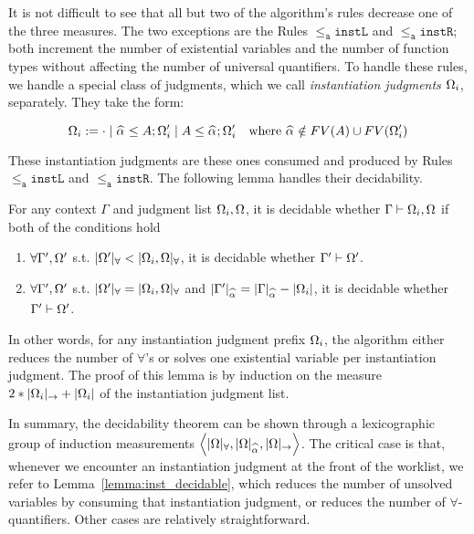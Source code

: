 It is not difficult to see that all but two of the algorithm's rules decrease
one of the three measures. The two exceptions are the Rules $\mathtt{{\le_a}instL}$ and $\mathtt{{\le_a}instR}$; both increment the number of existential
variables and the number of function types without affecting the number of
universal quantifiers.
To handle these rules, we handle a special class of judgments, which
we call \emph{instantiation judgments} $\exps_i$, separately. They 
take the form:
\begin{definition}[$\exps_i$]
$$\exps_i := \cdot \mid \jcons{\al\le A}{\exps_i'} \mid \jcons{A\le \al}{\exps_i'}
\quad\text{where } \al\notin FV(A)\cup FV(\exps_i')$$
\end{definition}
These instantiation judgments are these ones consumed and
produced by Rules $\mathtt{{\le_a}instL}$ and $\mathtt{{\le_a}instR}$.
The following lemma handles their decidability.
\begin{lemma}
	For any context $\Gamma$ and judgment list $\Omega_i, \Omega$, it is decidable whether $\Gamma\vdash \Omega_i,\Omega$ if both of the conditions hold
\begin{enumerate}[1)]
	\item $\forall \Gamma', \Omega'$ s.t. $|\Omega'|_\forall < |\Omega_i,\Omega|_\forall$, it is decidable whether $\Gamma'\vdash \Omega'$.
	\item $\forall \Gamma', \Omega'$ s.t. $|\Omega'|_\forall = |\Omega_i,\Omega|_\forall$ and $|\Gamma'|_{\al} = |\Gamma|_{\al} - |\exps_i|$, it is decidable whether $\Gamma'\vdash \Omega'$.
\end{enumerate}
\label{lemma:inst_decidable}
\end{lemma}
In other words, for any instantiation judgment prefix $\exps_i$, the algorithm
either reduces the number of $\forall$'s or solves one existential variable per
instantiation judgment. The proof of this lemma is by induction on the measure
$2*|\Omega_i|_{\to} + |\Omega_i|$ of the instantiation judgment list.

In summary, the decidability theorem can be shown through a lexicographic group
of induction measurements $\left\langle|\Omega|_\forall, |\Omega|_{\al},
|\Omega|_\to\right\rangle$. The critical case is that, whenever we
encounter an instantiation judgment at the front of the worklist, we refer to
Lemma~\ref{lemma:inst_decidable}, which reduces the number of unsolved
variables by consuming that instantiation judgment, or reduces the number of
$\forall$-quantifiers. Other cases are relatively straightforward.
